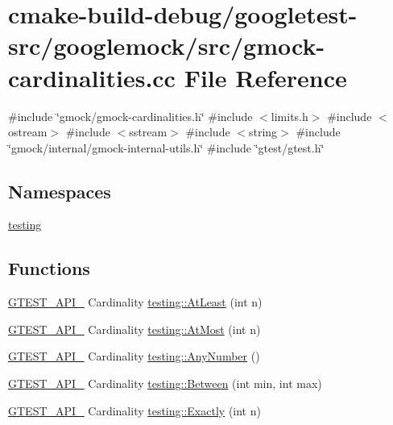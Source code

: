 \hypertarget{gmock-cardinalities_8cc}{}\section{cmake-\/build-\/debug/googletest-\/src/googlemock/src/gmock-\/cardinalities.cc File Reference}
\label{gmock-cardinalities_8cc}
{\ttfamily \#include \char`\"{}gmock/gmock-\/cardinalities.\+h\char`\"{}}\newline
{\ttfamily \#include $<$limits.\+h$>$}\newline
{\ttfamily \#include $<$ostream$>$}\newline
{\ttfamily \#include $<$sstream$>$}\newline
{\ttfamily \#include $<$string$>$}\newline
{\ttfamily \#include \char`\"{}gmock/internal/gmock-\/internal-\/utils.\+h\char`\"{}}\newline
{\ttfamily \#include \char`\"{}gtest/gtest.\+h\char`\"{}}\newline
\subsection*{Namespaces}
\begin{DoxyCompactItemize}
\item 
 \mbox{\hyperlink{namespacetesting}{testing}}
\end{DoxyCompactItemize}
\subsection*{Functions}
\begin{DoxyCompactItemize}
\item 
\mbox{\hyperlink{gtest-port_8h_aa73be6f0ba4a7456180a94904ce17790}{G\+T\+E\+S\+T\+\_\+\+A\+P\+I\+\_\+}} Cardinality \mbox{\hyperlink{namespacetesting_a137297cb3c582843989fbd937cf0fed2}{testing\+::\+At\+Least}} (int n)
\item 
\mbox{\hyperlink{gtest-port_8h_aa73be6f0ba4a7456180a94904ce17790}{G\+T\+E\+S\+T\+\_\+\+A\+P\+I\+\_\+}} Cardinality \mbox{\hyperlink{namespacetesting_a5487cd1068c78821ced96fbf542a91bb}{testing\+::\+At\+Most}} (int n)
\item 
\mbox{\hyperlink{gtest-port_8h_aa73be6f0ba4a7456180a94904ce17790}{G\+T\+E\+S\+T\+\_\+\+A\+P\+I\+\_\+}} Cardinality \mbox{\hyperlink{namespacetesting_aa1f8a6371097e1e9b8d6866020f35252}{testing\+::\+Any\+Number}} ()
\item 
\mbox{\hyperlink{gtest-port_8h_aa73be6f0ba4a7456180a94904ce17790}{G\+T\+E\+S\+T\+\_\+\+A\+P\+I\+\_\+}} Cardinality \mbox{\hyperlink{namespacetesting_a3bb2d3cdd3fdf5b4be1480fce549918e}{testing\+::\+Between}} (int min, int max)
\item 
\mbox{\hyperlink{gtest-port_8h_aa73be6f0ba4a7456180a94904ce17790}{G\+T\+E\+S\+T\+\_\+\+A\+P\+I\+\_\+}} Cardinality \mbox{\hyperlink{namespacetesting_aa9b1b32ba9e8d3db8ac0af0fc8785c8d}{testing\+::\+Exactly}} (int n)
\end{DoxyCompactItemize}

